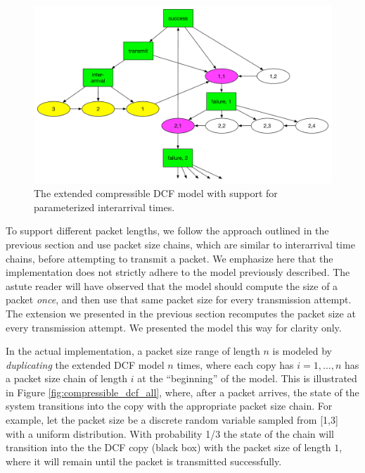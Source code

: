 \documentclass{llncs}
\begin{document}
\begin{figure}
\begin{center}
\includegraphics[scale=0.4]{../../sketches/compressible_dcf_arrival.pdf}
\caption{The extended compressible DCF model with support for parameterized interarrival times.}
\label{fig:compressible_dcf_arrival}
\end{center}
\end{figure}

To support different packet lengths, we follow the approach outlined in the previous section and use packet size chains, which are similar to interarrival time chains, before attempting to transmit a packet. We emphasize here that the implementation does not strictly adhere to the model previously described. The astute reader will have observed that the model should compute the size of a packet \emph{once}, and then use that same packet size for every transmission attempt. The extension we presented in the previous section recomputes the packet size at every transmission attempt. We presented the model this way for clarity only. 

In the actual implementation, a packet size range of length $n$ is modeled by \emph{duplicating} the extended DCF model $n$ times, where each copy has $i = 1,\dots,n$ has a packet size chain of length $i$ at the ``beginning'' of the model. This is illustrated in Figure \ref{fig:compressible_dcf_all}, where, after a packet arrives, the state of the system transitions into the copy with the appropriate packet size chain. For example, let the packet size be a discrete random variable sampled from [1,3] with a uniform distribution. With probability 1/3 the state of the chain will transition into the the DCF copy (black box) with the packet size of length $1$, where it will remain until the packet is transmitted successfully. 
\end{document}
